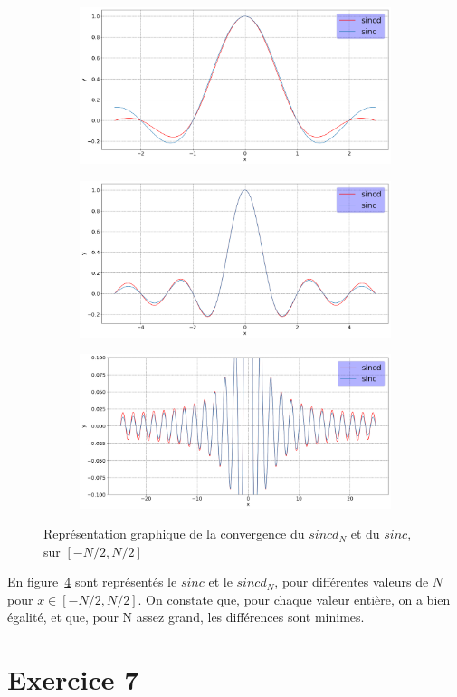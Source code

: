\documentclass[12pt,a4paper,onecolumn]{article}
\begin{document}
\begin{figure}[H]
	\centering
	\begin{subfigure}[b]{\textwidth}
		\centering
		\includegraphics[height = 0.25\textheight]{6_5}
		\label{fig_6_5}
	\end{subfigure}
	\begin{subfigure}[b]{\textwidth}
		\centering
		\includegraphics[height = 0.25\textheight]{6_10}
		\label{fig_6_10}
	\end{subfigure}
	\begin{subfigure}[b]{\textwidth}
		\centering
		\includegraphics[height = 0.25\textheight]{6_50}
		\label{fig_6_50}
	\end{subfigure}
	\caption{Représentation graphique de la convergence du \(sincd_N\) et du \(sinc\), sur \([-N/2, N/2]\)}
	\label{fig_6}
\end{figure}

En figure~\ref{fig_6} sont représentés le \(sinc\) et le \(sincd_N\), pour différentes valeurs de \(N\) pour \(x \in[-N/2, N/2]\). On constate que, pour chaque valeur entière, on a bien égalité, et que, pour N assez grand, les différences sont minimes.

\section{Exercice 7}
\end{document}
